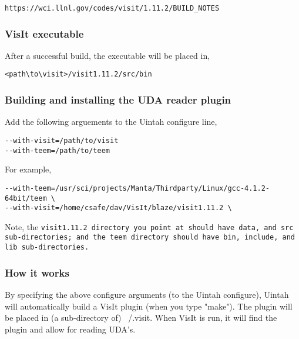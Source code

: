 \begin{Verbatim}[fontsize=\footnotesize]
https://wci.llnl.gov/codes/visit/1.11.2/BUILD_NOTES
\end{Verbatim}

\subsubsection{VisIt executable}
\label{sec:VisItExecutable}

After a successful build, the executable will be placed in,

\begin{Verbatim}[fontsize=\footnotesize]
<path\to\visit>/visit1.11.2/src/bin
\end{Verbatim}

\subsubsection{Building and installing the UDA reader plugin}
\label{sec:BuildingAndInstallingUDAPlugin}

Add the following arguements to the Uintah configure line,

\begin{Verbatim}[fontsize=\footnotesize]
--with-visit=/path/to/visit 
--with-teem=/path/to/teem
\end{Verbatim}

For example,

\begin{Verbatim}[fontsize=\footnotesize]
--with-teem=/usr/sci/projects/Manta/Thirdparty/Linux/gcc-4.1.2-64bit/teem \
--with-visit=/home/csafe/dav/VisIt/blaze/visit1.11.2 \
\end{Verbatim}

Note, the \tt visit1.11.2 \normalfont directory you point at should have \tt data\normalfont , and \tt src \normalfont sub-directories; and the \tt teem \normalfont directory should have \tt bin\normalfont , \tt include\normalfont , and \tt lib \normalfont sub-directories.

\subsubsection{How it works}
By specifying the above configure arguments (to the Uintah configure), Uintah will automatically build a VisIt plugin (when you type "make"). The plugin will be placed in (a sub-directory of) ~/.visit. When VisIt is run, it will find the plugin and allow for reading UDA's.


